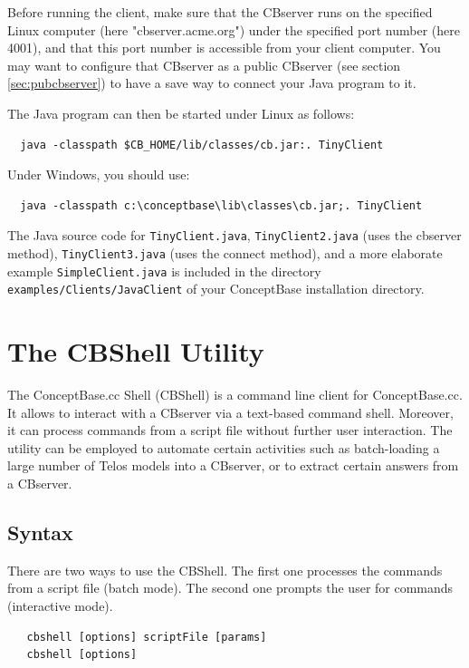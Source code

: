 Before running the client, make sure that the CBserver runs on the specified Linux computer
(here "cbserver.acme.org") under the specified port number (here 4001), and that
this port number is accessible from your client computer.
You may want to configure that CBserver as a public CBserver (see section \ref{sec:pubcbserver})
to have a save way to connect your Java program to it.

The Java program can then be started under Linux as follows:

\begin{verbatim}
  java -classpath $CB_HOME/lib/classes/cb.jar:. TinyClient
\end{verbatim}

Under Windows, you should use:

\begin{verbatim}
  java -classpath c:\conceptbase\lib\classes\cb.jar;. TinyClient
\end{verbatim}

The Java source code for {\tt TinyClient.java}, {\tt TinyClient2.java} (uses the cbserver method),
{\tt TinyClient3.java} (uses the connect method),
 and a more elaborate example 
{\tt SimpleClient.java} is included in the directory {\tt examples/Clients/JavaClient}
of your ConceptBase installation directory.


\chapter{The CBShell Utility}
\label{cha:cbshell}

The ConceptBase.cc Shell (CBShell) is a command line client for ConceptBase.cc. It allows
to interact with a CBserver via a text-based command shell.
Moreover, it can process commands from a script file without further user
interaction. The utility can be employed to automate certain activities such
as batch-loading a large number of Telos models into a CBserver,
or to extract certain answers from a CBserver.

\section{Syntax}

There are two ways to use the CBShell. The first one processes the commands from a script
file (batch mode). The second one prompts the user for commands (interactive mode).

\begin{verbatim}
   cbshell [options] scriptFile [params]
   cbshell [options]
\end{verbatim}


